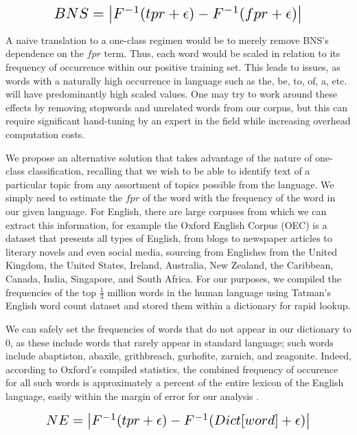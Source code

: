 \documentclass[11pt]{article}
\begin{document}
\vspace{-4mm}
\begin{equation}
    \resizebox{0.75\linewidth}{!}
    {$
    BNS = \left|F^{-1}(tpr + \epsilon) - F^{-1}(fpr + \epsilon)\right|
    $}
\end{equation}

A naive translation to a one-class regimen would be to merely remove BNS's dependence on the $fpr$ term. Thus, each word would be scaled in relation to its frequency of occurrence within our positive training set. This leads to issues, as words with a naturally high occurrence in language such as the, be, to, of, a, etc. will have predominantly high scaled values. One may try to work around these effects by removing stopwords and unrelated words from our corpus, but this can require significant hand-tuning by an expert in the field while increasing overhead computation costs.

We propose an alternative solution that takes advantage of the nature of one-class classification, recalling that we wish to be able to identify text of a particular topic from any assortment of topics possible from the language. We simply need to estimate the $fpr$ of the word with the frequency of the word in our given language. For English, there are large corpuses from which we can extract this information, for example the Oxford English Corpus (OEC) is a dataset that presents all types of English, from blogs to newspaper articles to literary novels and even social media, sourcing from Englishes from the United Kingdom, the United States, Ireland, Australia, New Zealand, the Caribbean, Canada, India, Singapore, and South Africa. For our purposes, we compiled the frequencies of the top $\frac{1}{3}$ million words in the human language using Tatman's English word count dataset \cite{tatmankaggleword, brantsgooglewordset} and stored them within a dictionary for rapid lookup.

We can safely set the frequencies of words that do not appear in our dictionary to $0$, as these include words that rarely appear in standard language; such words include abaptiston, abaxile, grithbreach, gurhofite, zarnich, and zeagonite. Indeed, according to Oxford's compiled statistics, the combined frequency of occurence for all such words is approximately a percent of the entire lexicon of the English language, easily within the margin of error for our analysis \cite{oecstats}.

\vspace{-0.5cm}
\begin{equation}
    \resizebox{0.8\linewidth}{!}
    {$
    NE = \left|F^{-1}(tpr + \epsilon) - F^{-1}(Dict[word] + \epsilon)\right|
    $}
\end{equation}
\end{document}

